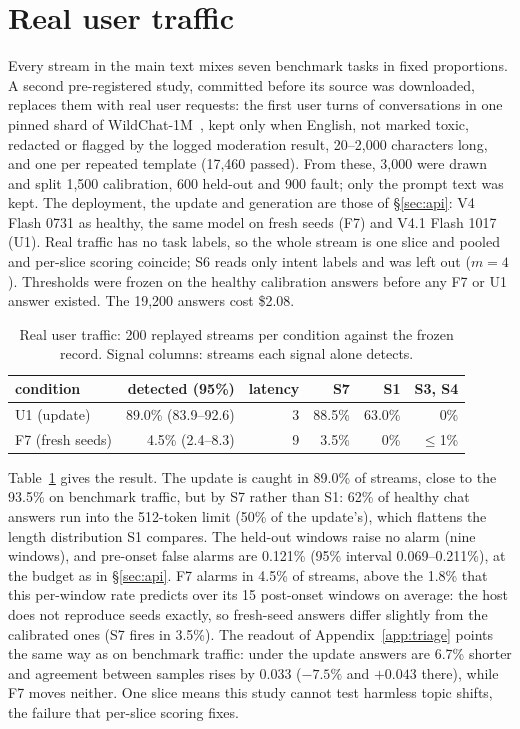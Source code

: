 \documentclass{article}
\begin{document}
\section{Real user traffic}
\label{app:chat}
Every stream in the main text mixes seven benchmark tasks in fixed proportions. A
second pre-registered study, committed before its source was downloaded, replaces
them with real user requests: the first user turns of conversations in one pinned
shard of WildChat-1M~\citep{zhao2024wildchat}, kept only when English, not marked
toxic, redacted or flagged by the logged moderation result, 20--2{,}000 characters
long, and one per repeated template (17{,}460 passed). From these, 3{,}000 were
drawn and split 1{,}500 calibration, 600 held-out and 900 fault; only the prompt
text was kept. The deployment, the update and generation are those of
\S\ref{sec:api}: V4 Flash 0731 as healthy, the same model on fresh seeds (F7) and
V4.1 Flash 1017 (U1). Real traffic has no task labels, so the whole stream is one
slice and pooled and per-slice scoring coincide; S6 reads only intent labels and
was left out ($m=4$). Thresholds were frozen on the healthy calibration answers
before any F7 or U1 answer existed. The 19{,}200 answers cost \$2.08.

\begin{table}[h]
  \centering\small
  \caption{Real user traffic: 200 replayed streams per condition against the
  frozen record. Signal columns: streams each signal alone detects.}
  \label{tab:chat}
  \begin{tabular}{lrrrrr}
    \toprule
    condition & detected (95\%) & latency & S7 & S1 & S3, S4 \\
    \midrule
    U1 (update) & 89.0\% (83.9--92.6) & 3 & 88.5\% & 63.0\% & 0\% \\
    F7 (fresh seeds) & 4.5\% (2.4--8.3) & 9 & 3.5\% & 0\% & $\le$1\% \\
    \bottomrule
  \end{tabular}
\end{table}

Table~\ref{tab:chat} gives the result. The update is caught in 89.0\% of streams,
close to the 93.5\% on benchmark traffic, but by S7 rather than S1: 62\% of healthy
chat answers run into the 512-token limit (50\% of the update's), which flattens the
length distribution S1 compares. The held-out windows raise no alarm (nine windows),
and pre-onset false alarms are 0.121\% (95\% interval 0.069--0.211\%), at the
budget as in \S\ref{sec:api}. F7 alarms in 4.5\% of streams, above the 1.8\% that this per-window rate predicts
over its 15 post-onset windows on average: the host does not reproduce seeds
exactly, so fresh-seed answers differ slightly from the calibrated ones (S7 fires
in 3.5\%). The readout of
Appendix~\ref{app:triage} points the same way as on benchmark traffic: under the
update answers are 6.7\% shorter and agreement between samples rises by 0.033
($-7.5\%$ and $+0.043$ there), while F7 moves neither. One slice means this study
cannot test harmless topic shifts, the failure that per-slice scoring fixes.
\end{document}
